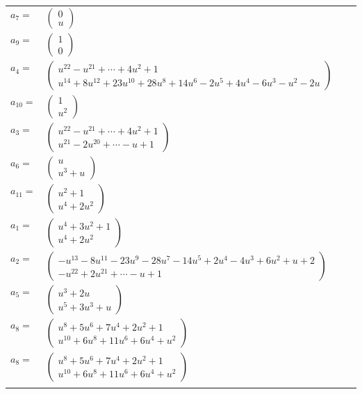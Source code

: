 \documentclass[1p]{elsarticle_modified}
\theoremstyle{definition}
\begin{document}
\begin{tabular}{m{7pt} m{180pt} m{7pt} m{180pt} }
\flushright $a_{7}=$&$\begin{pmatrix}0\\u\end{pmatrix}$ \\
\flushright $a_{9}=$&$\begin{pmatrix}1\\0\end{pmatrix}$ \\
\flushright $a_{4}=$&$\begin{pmatrix}u^{22}- u^{21}+\cdots+4 u^2+1\\u^{14}+8 u^{12}+23 u^{10}+28 u^8+14 u^6-2 u^5+4 u^4-6 u^3- u^2-2 u\end{pmatrix}$ \\
\flushright $a_{10}=$&$\begin{pmatrix}1\\u^2\end{pmatrix}$ \\
\flushright $a_{3}=$&$\begin{pmatrix}u^{22}- u^{21}+\cdots+4 u^2+1\\u^{21}-2 u^{20}+\cdots- u+1\end{pmatrix}$ \\
\flushright $a_{6}=$&$\begin{pmatrix}u\\u^3+u\end{pmatrix}$ \\
\flushright $a_{11}=$&$\begin{pmatrix}u^2+1\\u^4+2 u^2\end{pmatrix}$ \\
\flushright $a_{1}=$&$\begin{pmatrix}u^4+3 u^2+1\\u^4+2 u^2\end{pmatrix}$ \\
\flushright $a_{2}=$&$\begin{pmatrix}- u^{13}-8 u^{11}-23 u^9-28 u^7-14 u^5+2 u^4-4 u^3+6 u^2+u+2\\- u^{22}+2 u^{21}+\cdots- u+1\end{pmatrix}$ \\
\flushright $a_{5}=$&$\begin{pmatrix}u^3+2 u\\u^5+3 u^3+u\end{pmatrix}$ \\
\flushright $a_{8}=$&$\begin{pmatrix}u^8+5 u^6+7 u^4+2 u^2+1\\u^{10}+6 u^8+11 u^6+6 u^4+u^2\end{pmatrix}$\\ \flushright $a_{8}=$&$\begin{pmatrix}u^8+5 u^6+7 u^4+2 u^2+1\\u^{10}+6 u^8+11 u^6+6 u^4+u^2\end{pmatrix}$\\&\end{tabular}
\end{document}
